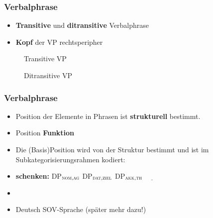 \begin{frame}
\frametitle{Verbalphrase}

\begin{itemize}
	\item \textbf{Transitive} und \textbf{ditransitive} Verbalphrase
	\item \textbf{Kopf} der VP \ras rechtsperipher 
\end{itemize}

\begin{figure}[b]
	\begin{minipage}[b]{0.4\textwidth}
	\centering
		\caption{Transitive VP}	
  	\end{minipage} 
	\begin{minipage}[b]{0.52\textwidth}
	\centering
		\caption{Ditransitive VP}	
  	\end{minipage}
\end{figure}

\end{frame}


\begin{frame}
\frametitle{Verbalphrase}

\begin{itemize}
	\item Position der Elemente in Phrasen ist \textbf{strukturell} bestimmt.
	\item Position \ras \textbf{Funktion} 
	\item Die (Basis)Position wird von der Struktur bestimmt und ist im Subkategorisierungsrahmen kodiert:
	\item[] \textbf{schenken:} {\small DP$_{\textsc{nom,ag}}$ DP$_{\textsc{dat,ziel}}$  DP$_{\textsc{akk,th}}$ $\underline{\qquad}$ }
	\item[]
	\item Deutsch \ras SOV-Sprache (später mehr dazu!)
\end{itemize}

\end{frame}

